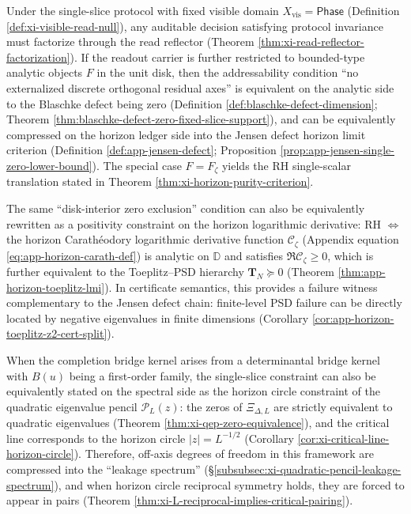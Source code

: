 \begin{corollary}\label{cor:xi-single-slice-rh-typing-principle}
Under the single-slice protocol with fixed visible domain \(X_{\mathrm{vis}}=\mathsf{Phase}\) (Definition \ref{def:xi-visible-read-null}), any auditable decision satisfying protocol invariance must factorize through the read reflector (Theorem \ref{thm:xi-read-reflector-factorization}).
If the readout carrier is further restricted to bounded-type analytic objects \(F\) in the unit disk, then the addressability condition ``no externalized discrete orthogonal residual axes'' is equivalent on the analytic side to the Blaschke defect being zero (Definition \ref{def:blaschke-defect-dimension}; Theorem \ref{thm:blaschke-defect-zero-fixed-slice-support}), and can be equivalently compressed on the horizon ledger side into the Jensen defect horizon limit criterion (Definition \ref{def:app-jensen-defect}; Proposition \ref{prop:app-jensen-single-zero-lower-bound}).
The special case \(F=F_{\zeta}\) yields the RH single-scalar translation stated in Theorem \ref{thm:xi-horizon-purity-criterion}.
\par
The same ``disk-interior zero exclusion'' condition can also be equivalently rewritten as a positivity constraint on the horizon logarithmic derivative: RH \(\Longleftrightarrow\) the horizon Carath\'eodory logarithmic derivative function \(\mathscr{C}_{\zeta}\) (Appendix equation \eqref{eq:app-horizon-carath-def}) is analytic on \(\mathbb{D}\) and satisfies \(\Re\mathscr{C}_{\zeta}\ge 0\), which is further equivalent to the Toeplitz--PSD hierarchy \(\mathbf{T}_N\succeq 0\) (Theorem \ref{thm:app-horizon-toeplitz-lmi}).
In certificate semantics, this provides a failure witness complementary to the Jensen defect chain: finite-level PSD failure can be directly located by negative eigenvalues in finite dimensions (Corollary \ref{cor:app-horizon-toeplitz-z2-cert-split}).
\par
When the completion bridge kernel arises from a determinantal bridge kernel with \(B(u)\) being a first-order family, the single-slice constraint can also be equivalently stated on the spectral side as the horizon circle constraint of the quadratic eigenvalue pencil \(\mathcal{P}_L(z)\): the zeros of \(\Xi_{\Delta,L}\) are strictly equivalent to quadratic eigenvalues (Theorem \ref{thm:xi-qep-zero-equivalence}), and the critical line corresponds to the horizon circle \(|z|=L^{-1/2}\) (Corollary \ref{cor:xi-critical-line-horizon-circle}).
Therefore, off-axis degrees of freedom in this framework are compressed into the ``leakage spectrum'' (\S\ref{subsubsec:xi-quadratic-pencil-leakage-spectrum}), and when horizon circle reciprocal symmetry holds, they are forced to appear in pairs (Theorem \ref{thm:xi-L-reciprocal-implies-critical-pairing}).
\end{corollary}


